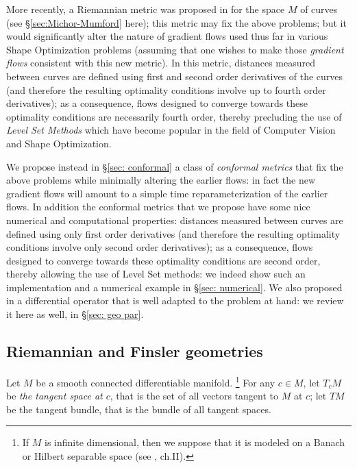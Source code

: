 \documentclass[twoside,a4paper,english]{article}
\begin{document}
More recently, a Riemannian metric was proposed in
\cite{Michor-Mumford} for the space $M$ of curves (see
\S\ref{sec:Michor-Mumford} here); this metric may fix the above
problems; but it would significantly alter the nature of gradient
flows used thus far in various Shape Optimization problems (assuming that
one wishes to make those \emph{gradient flows} consistent with this
new metric). In this metric, distances measured between curves are
defined using first and second order derivatives of the curves (and
therefore the resulting optimality conditions involve up to fourth
order derivatives); as a consequence, flows designed to converge
towards these optimality conditions are necessarily fourth order,
thereby precluding the use of \emph{Level Set Methods} which have
become popular in the field of Computer Vision and Shape Optimization.


We propose instead in \S\ref{sec: conformal} a class of
\emph{conformal metrics} that fix the above problems while minimally
altering the earlier flows: in fact the new gradient flows will amount
to a simple time reparameterization of the earlier flows.  In addition
the conformal metrics that we propose have some nice numerical and
computational properties: distances measured between curves are
defined using only first order derivatives (and therefore the
resulting optimality conditions involve only second order
derivatives); as a consequence, flows designed to converge towards
these optimality conditions are second order, thereby allowing the use
of Level Set methods: we indeed show such an implementation and a
numerical example in \S\ref{sec: numerical}.  We also proposed in
\cite{YM:eusipco} a differential operator that is well adapted to the
problem at hand: we review it here as well, in \S\ref{sec: geo par}.







\subsection{Riemannian and Finsler geometries}

Let  $M$ be a smooth connected differentiable manifold.%
\footnote{If $M$ is infinite dimensional, then we suppose that 
  it is modeled on a Banach or Hilbert separable space
  (see \cite{Lang:FDG}, ch.II).}
For any $c\in M$,
let $T_cM$ be \emph{the tangent space at $c$}, that is
the set of all vectors tangent to $M$ at $c$;
let $TM$ be the tangent bundle, that is the bundle of all tangent spaces.
\end{document}
